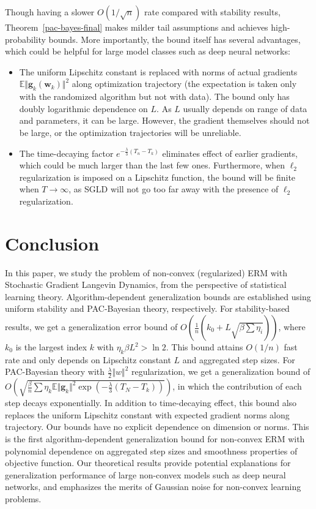 \documentclass[final,12pt]{colt2018} %
\begin{document}
Though having a slower $O(1/\sqrt{n})$ rate compared with stability results,  Theorem~\ref{pac-bayes-final} makes milder tail assumptions and achieves high-probability bounds. More importantly, the bound itself has several advantages, which could be helpful for large model classes such as deep neural networks:
\begin{itemize}
  \item The uniform Lipschitz constant is replaced with norms of actual gradients $\mathbb{E}\Vert\bm{g}_k(\bm{w}_k)\Vert^2$ along optimization trajectory (the expectation is taken only with the randomized algorithm but not with data). The bound only has doubly logarithmic dependence on $L$. As $L$ usually depends on range of data and parameters, it can be large. However, the gradient themselves should not be large, or the optimization trajectories will be unreliable.
  \item The time-decaying factor $e^{-\frac{\lambda}{3}(T_n-T_k)}$ eliminates effect of earlier gradients, which could be much larger than the last few ones. Furthermore, when $\ell_2$ regularization is imposed on a Lipschitz function, the bound will be finite when $T\rightarrow \infty$, as SGLD will not go too far away with the presence of $\ell_2$ regularization.
\end{itemize}

\section{Conclusion}
In this paper, we study the problem of non-convex (regularized) ERM with Stochastic Gradient Langevin Dynamics, from the perspective of statistical learning theory. Algorithm-dependent generalization bounds are established using uniform stability and PAC-Bayesian theory, respectively. For stability-based results, we get a generalization error bound of $O\left(\frac{1}{n}({k_0+L\sqrt{\beta\sum \eta_i}})\right)$, where $k_0$ is the largest index $k$ with $\eta_k\beta L^2> \ln 2$. This bound attains $O(1/n)$ fast rate and only depends on Lipschitz constant $L$ and aggregated step sizes. For PAC-Bayesian theory with $\frac{\lambda}{2}\Vert w\Vert^2$ regularization, we get a generalization bound of $O\left(\sqrt{\frac{\beta}{n}{\sum \eta_k\mathbb{E}\Vert\bm{g}_k\Vert^2\exp(-\frac{\lambda}{3}(T_N-T_k))}}\right)$, in which the contribution of each step decays exponentially. In addition to time-decaying effect, this bound also replaces the uniform Lipschitz constant with expected gradient norms along trajectory. Our bounds have no explicit dependence on dimension or norms. This is the first algorithm-dependent generalization bound for non-convex ERM with polynomial dependence on aggregated step sizes and smoothness properties of objective function. Our theoretical results provide potential explanations for generalization performance of large non-convex models such as deep neural networks, and emphasizes the merits of Gaussian noise for non-convex learning problems.
\end{document}
